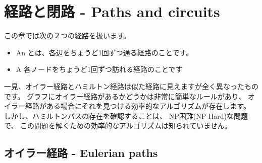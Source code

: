 \chapter{経路と閉路 - Paths and circuits}

この章では次の２つの経路を扱います。
\begin{itemize}
\item An  とは、各辺をちょうど1回ずつ通る経路のことです。
\item A  各ノードをちょうど1回ずつ訪れる経路のことです
\end{itemize}

一見、オイラー経路とハミルトン経路は似た経路に見えますが全く異なったものです。
グラフにオイラー経路があるかどうかは非常に簡単なルールがあり、
オイラー経路がある場合にそれを見つける効率的なアルゴリズムが存在します。
しかし、ハミルトンパスの存在を確認することは、 NP困難(NP-Hard)な問題で、
この問題を解くための効率的なアルゴリズムは知られていません。

\section{オイラー経路 - Eulerian paths}


